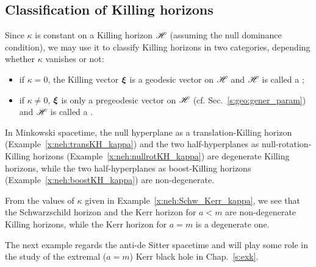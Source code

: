 \subsection{Classification of Killing horizons} \label{s:neh:classif_KH}

Since $\kappa$ is constant on a Killing horizon $\mathscr{H}$ (assuming the null dominance
condition), we may use it to classify Killing horizons in two
categories, depending whether $\kappa$ vanishes or not:
\begin{itemize}
\item if $\kappa = 0$, the Killing vector $\bm{\xi}$ is a geodesic vector on $\mathscr{H}$
and $\mathscr{H}$ is called a ;
\item if $\kappa \not=0$, $\bm{\xi}$ is only a pregeodesic vector on $\mathscr{H}$
(cf. Sec.~\ref{s:geo:gener_param})
and $\mathscr{H}$ is called a .
\end{itemize}

\begin{example}
In Minkowski spacetime, the null hyperplane as a translation-Killing horizon
(Example~\ref{x:neh:transKH_kappa}) and the two half-hyperplanes as
null-rotation-Killing horizons (Example~\ref{x:neh:nullrotKH_kappa}) are
degenerate Killing horizons, while the two half-hyperplanes as
boost-Killing horizons (Example~\ref{x:neh:boostKH_kappa}) are non-degenerate.
\end{example}

\begin{example}
From the values of $\kappa$ given in Example~\ref{x:neh:Schw_Kerr_kappa},
we see that the Schwarzschild horizon and the Kerr horizon for
$a<m$ are non-degenerate Killing horizons, while the Kerr horizon for
$a=m$ is a degenerate one.
\end{example}

The next example regards the anti-de Sitter spacetime and will play some
role in the study of the extremal ($a=m$) Kerr black hole in Chap.~\ref{s:exk}.

